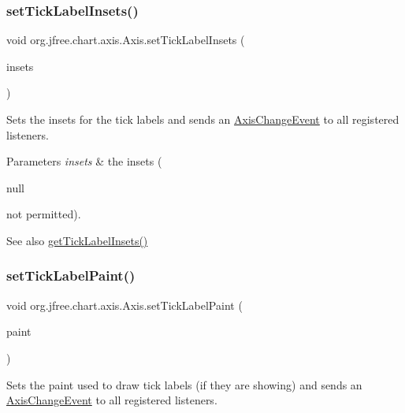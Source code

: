 \subsubsection{\texorpdfstring{set\+Tick\+Label\+Insets()}{setTickLabelInsets()}}
{\footnotesize\ttfamily void org.\+jfree.\+chart.\+axis.\+Axis.\+set\+Tick\+Label\+Insets (\begin{DoxyParamCaption}\item[{Rectangle\+Insets}]{insets }\end{DoxyParamCaption})}

Sets the insets for the tick labels and sends an \mbox{\hyperlink{}{Axis\+Change\+Event}} to all registered listeners.


\begin{DoxyParams}{Parameters}
{\em insets} & the insets (
\begin{DoxyCode}
null 
\end{DoxyCode}
 not permitted).\\
\hline
\end{DoxyParams}
\begin{DoxySeeAlso}{See also}
\mbox{\hyperlink{classorg_1_1jfree_1_1chart_1_1axis_1_1_axis_a1916ea69816af319a66834961b52b6f6}{get\+Tick\+Label\+Insets()}} 
\end{DoxySeeAlso}
\mbox{\label{classorg_1_1jfree_1_1chart_1_1axis_1_1_axis_a5ce2c0a548ab9ccc1946f4495120f78a}} 
\subsubsection{\texorpdfstring{set\+Tick\+Label\+Paint()}{setTickLabelPaint()}}
{\footnotesize\ttfamily void org.\+jfree.\+chart.\+axis.\+Axis.\+set\+Tick\+Label\+Paint (\begin{DoxyParamCaption}\item[{Paint}]{paint }\end{DoxyParamCaption})}

Sets the paint used to draw tick labels (if they are showing) and sends an \mbox{\hyperlink{}{Axis\+Change\+Event}} to all registered listeners.


